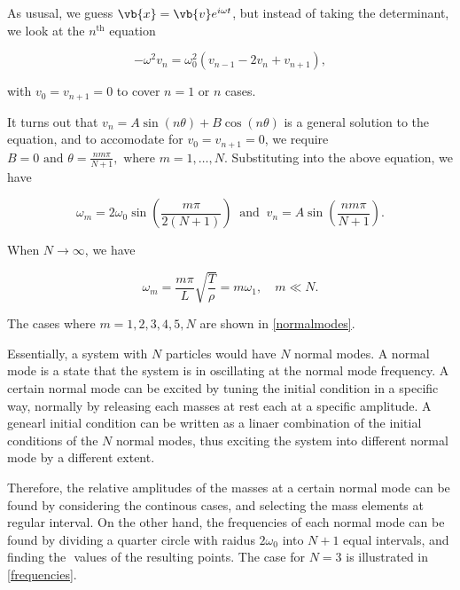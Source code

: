 \documentclass[a4paper,12pt]{report}
\begin{document}
As ususal, we guess \(\vb{x} = \vb{v} e^{i \omega t} \), but instead of taking the determinant, we look at the \(n^{\text{th}} \) equation

\begin{equation}
	-\omega ^2 v_{n} = \omega _{0}^2(v_{n-1} -2v_{n} +v_{n+1} ),
\end{equation}

with \(v_{0} = v_{n+1} =0 \) to cover \(n=1 \text { or } n\) cases.  

It turns out that \(\displaystyle v_{n} = A \sin (n \theta ) + B\cos (n \theta ) \) is a general solution to the equation, and to accomodate for \(v_{0} = v_{n+1} = 0  \), we require \(B = 0 \text { and } \displaystyle \theta = \frac{nm \pi }{N+1}, \text{ where } m = 1,\ldots , N \). Substituting into the above equation, we have

\begin{equation}
	\omega_{m}  = 2 \omega _{0}\sin \left( \frac{m\pi }{2(N+1)}  \right) ~\text { and }~ v_{n} = A \sin \left( \frac{nm \pi }{N+1}  \right). \label{normalmode} 
\end{equation}

When \(N \to \infty\), we have 

\begin{equation}
	\omega _{m} =  \frac{m\pi }{L} \sqrt{\frac{T}{\rho } } = m \omega _{1} , \quad m \ll N.
\end{equation}

The cases where \(m = 1,2,3,4,5,N\) are shown in \cref{normalmodes}. 


Essentially, a system with \(N\) particles would have \(N\) normal modes. A normal mode is a state that the system is in oscillating at the normal mode frequency. A certain normal mode can be excited by tuning the initial condition in a specific way, normally by releasing each masses at rest each at a specific amplitude. A genearl initial condition can be written as a linaer combination of the initial conditions of the \(N\) normal modes, thus exciting the system into different normal mode by a different extent. 

Therefore, the relative amplitudes of the masses at a certain normal mode can be found by considering the continous cases, and selecting the mass elements at regular interval. On the other hand, the frequencies of each normal mode can be found by dividing a quarter circle with raidus \(2 \omega _{0} \) into \(N+1\) equal intervals, and finding the \(\) values of the resulting points. The case for \(N=3\) is illustrated in \cref{frequencies}.
\end{document}
